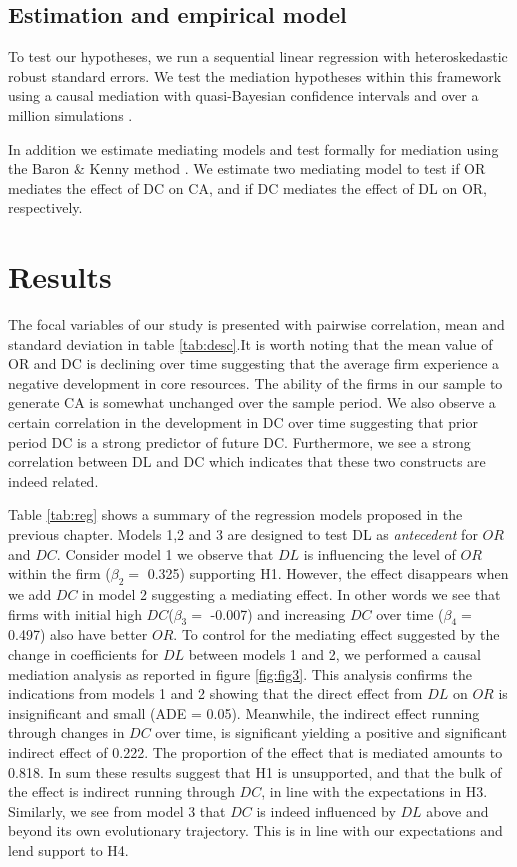 \documentclass[review,fleqn]{elsarticle}\usepackage[]{graphicx}\usepackage[]{color}
\begin{document}
\subsection{Estimation and empirical model}

To test our hypotheses, we run a sequential linear regression with heteroskedastic robust
standard errors. We test the mediation hypotheses within this framework using a causal
mediation \citep{Baron1986,MacKinnon2008} with quasi-Bayesian confidence intervals and
over a million simulations \citep{Imai2010}.

In addition we estimate mediating models and test formally for mediation using the Baron
\& Kenny method \citep{Baron1986,MacKinnon2008}. We estimate two mediating model to test
if OR mediates the effect of DC on CA, and if DC mediates the effect of DL on OR,
respectively. 

\section{Results}
The focal variables of our study is presented with pairwise correlation, mean and standard
deviation in table \ref{tab:desc}.It is worth noting that the mean value of OR and DC is
declining over time suggesting that the average firm experience a negative development in
core resources. The ability of the firms in our sample to generate CA is somewhat
unchanged over the sample period. We also observe a certain correlation in the development
in DC over time suggesting that prior period DC is a strong predictor of future
DC. Furthermore, we see a strong correlation between DL and DC which indicates that these
two constructs are indeed related.



Table \ref{tab:reg} shows a summary of the regression models proposed in the previous
chapter. Models 1,2 and 3 are designed to test DL as \emph{antecedent} for $OR$ and
$DC$. Consider model 1 we observe that $DL$ is influencing the level of $OR$ within the
firm ($\beta_2 =$ 0.325) supporting H1. However, the effect disappears when we
add $DC$ in model 2 suggesting a mediating effect. In other words we see that firms with
initial high $DC$($\beta_3=$ -0.007) and increasing $DC$ over time ($\beta_4=$
0.497) also have better $OR$. To control for the mediating effect suggested by
the change in coefficients for $DL$ between models 1 and 2, we performed a causal
mediation analysis as reported in figure \ref{fig:fig3}. This analysis confirms the
indications from models 1 and 2 showing that the direct effect from $DL$ on $OR$ is
insignificant and small (ADE = 0.05). Meanwhile, the indirect effect
running through changes in $DC$ over time, is significant yielding a positive and
significant indirect effect of 0.222. The proportion of the effect that is
mediated amounts to 0.818. In sum these results suggest that H1 is
unsupported, and that the bulk of the effect is indirect running through $DC$, in line with
the expectations in H3. Similarly, we see from model 3 that $DC$ is indeed influenced by $DL$
above and beyond its own evolutionary trajectory. This is in line with our expectations
and lend support to H4.
\end{document}
